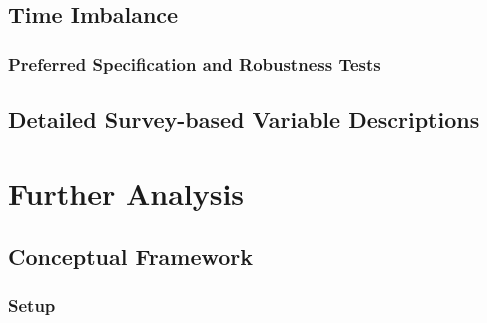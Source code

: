 \documentclass[12pt,english]{article}
\begin{document}

\subsection{Time Imbalance}
\label{time_confound_appendix}


\subsubsection{Preferred Specification and Robustness Tests}


\FloatBarrier


\subsection{Detailed Survey-based Variable Descriptions}
\label{variable_descriptions}


\section{Further Analysis}




\subsection{Conceptual Framework}
\label{model}


\subsubsection{Setup}\label{model_setup}


\label{eq_avgprob}

\end{document}
